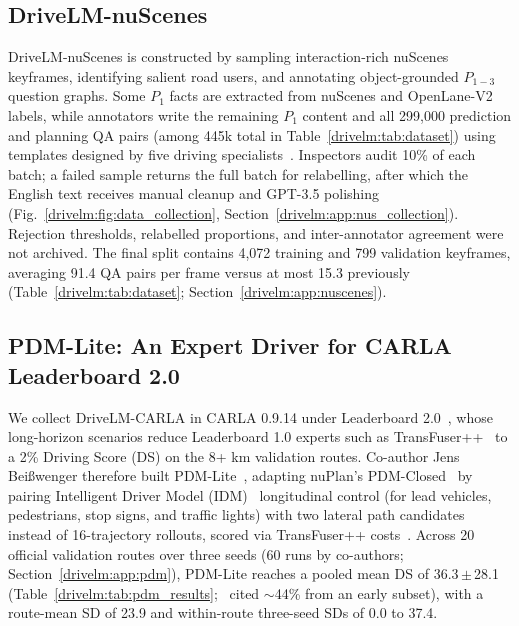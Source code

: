 \subsection{DriveLM-nuScenes}\label{drivelm:sec:data_nus}

DriveLM-nuScenes is constructed by sampling interaction-rich nuScenes keyframes, identifying salient road users, and annotating object-grounded $P_{1-3}$ question graphs. Some $P_1$ facts are extracted from nuScenes and OpenLane-V2 labels, while annotators write the remaining $P_1$ content and all 299,000 prediction and planning QA pairs (among 445k total in Table~\ref{drivelm:tab:dataset}) using templates designed by five driving specialists~\cite{caesar2020nuscenes,wang2023openlanev2}. Inspectors audit 10\% of each batch; a failed sample returns the full batch for relabelling, after which the English text receives manual cleanup and GPT-3.5 polishing (Fig.~\ref{drivelm:fig:data_collection}, Section~\ref{drivelm:app:nus_collection}). Rejection thresholds, relabelled proportions, and inter-annotator agreement were not archived. The final split contains 4,072 training and 799 validation keyframes, averaging 91.4 QA pairs per frame versus at most 15.3 previously (Table~\ref{drivelm:tab:dataset}; Section~\ref{drivelm:app:nuscenes}).

\subsection{PDM-Lite: An Expert Driver for CARLA Leaderboard 2.0}\label{drivelm:sec:data_expert}

We collect DriveLM-CARLA in CARLA 0.9.14 under Leaderboard 2.0~\cite{dosovitskiy2017carla}, whose long-horizon scenarios reduce Leaderboard 1.0 experts such as TransFuser++~\cite{jaeger2023hidden} to a 2\% Driving Score (DS) on the 8+ km validation routes. Co-author Jens Bei{\ss}wenger therefore built PDM-Lite~\cite{beisswenger2024pdmlite}, adapting nuPlan's PDM-Closed~\cite{dauner2023parting,caesar2021nuplan} by pairing Intelligent Driver Model (IDM)~\cite{treiber2000idm} longitudinal control (for lead vehicles, pedestrians, stop signs, and traffic lights) with two lateral path candidates instead of 16-trajectory rollouts, scored via TransFuser++ costs~\cite{jaeger2023hidden}. Across 20 official validation routes over three seeds (60 runs by co-authors; Section~\ref{drivelm:app:pdm}), PDM-Lite reaches a pooled mean DS of 36.3\,$\pm$\,28.1 (Table~\ref{drivelm:tab:pdm_results};~\cite{sima2024drivelm} cited $\sim$44\% from an early subset), with a route-mean SD of 23.9 and within-route three-seed SDs of 0.0 to 37.4.

